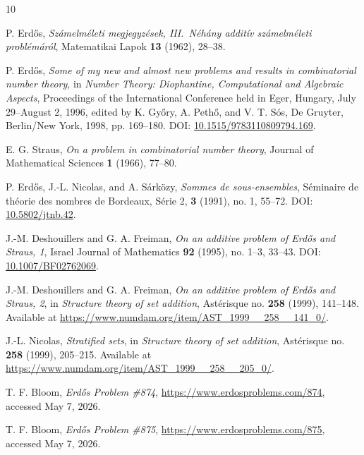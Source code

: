 \documentclass[11pt]{article}
\begin{document}
\begin{thebibliography}{10}

P. Erd\H{o}s,
\emph{Sz\'amelm\'eleti megjegyz\'esek, III.\ N\'eh\'any addit\'iv sz\'amelm\'eleti probl\'em\'ar\'ol},
Matematikai Lapok \textbf{13} (1962), 28--38.

P. Erd\H{o}s,
\emph{Some of my new and almost new problems and results in combinatorial number theory},
in \emph{Number Theory: Diophantine, Computational and Algebraic Aspects},
Proceedings of the International Conference held in Eger, Hungary, July 29--August 2, 1996,
edited by K. Gy\H{o}ry, A. Peth\H{o}, and V. T. S\'os,
De Gruyter, Berlin/New York, 1998, pp. 169--180.
DOI: \href{https://doi.org/10.1515/9783110809794.169}{10.1515/9783110809794.169}.

E. G. Straus,
\emph{On a problem in combinatorial number theory},
Journal of Mathematical Sciences \textbf{1} (1966), 77--80.

P. Erd\H{o}s, J.-L. Nicolas, and A. S\'ark\"ozy,
\emph{Sommes de sous-ensembles},
S\'eminaire de th\'eorie des nombres de Bordeaux, S\'erie 2, \textbf{3} (1991), no. 1, 55--72.
DOI: \href{https://doi.org/10.5802/jtnb.42}{10.5802/jtnb.42}.

J.-M. Deshouillers and G. A. Freiman,
\emph{On an additive problem of Erd\H{o}s and Straus, 1},
Israel Journal of Mathematics \textbf{92} (1995), no. 1--3, 33--43.
DOI: \href{https://doi.org/10.1007/BF02762069}{10.1007/BF02762069}.

J.-M. Deshouillers and G. A. Freiman,
\emph{On an additive problem of Erd\H{o}s and Straus, 2},
in \emph{Structure theory of set addition}, Ast\'erisque no. \textbf{258} (1999), 141--148.
Available at \url{https://www.numdam.org/item/AST_1999__258__141_0/}.

J.-L. Nicolas,
\emph{Stratified sets},
in \emph{Structure theory of set addition}, Ast\'erisque no. \textbf{258} (1999), 205--215.
Available at \url{https://www.numdam.org/item/AST_1999__258__205_0/}.

T. F. Bloom,
\emph{Erd\H{o}s Problem \#874},
\url{https://www.erdosproblems.com/874}, accessed May 7, 2026.

T. F. Bloom,
\emph{Erd\H{o}s Problem \#875},
\url{https://www.erdosproblems.com/875}, accessed May 7, 2026.

\end{thebibliography}
\end{document}
